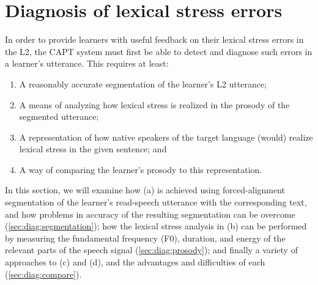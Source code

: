 %
%
\chapter{Diagnosis of lexical stress errors}
\label{chap:diagnosis}


In order to provide learners with useful feedback on their lexical stress errors in the L2, the CAPT system must first be able to detect and diagnose such errors in a learner's utterance. This requires at least:
\begin{enumerate}[label=(\alph*)]
\item A reasonably accurate segmentation of the learner's L2 utterance; %
\item A means of analyzing how lexical stress is realized in the prosody of the segmented utterance;
\item A representation of how native speakers of the target language (would) realize  lexical stress in the given sentence; and
\item A way of comparing the learner's prosody to this representation. 
\end{enumerate}

In this section, we will examine how (a) is achieved using forced-alignment segmentation of the learner's read-speech utterance with the corresponding text, and how problems in accuracy of the resulting segmentation can be overcome (\cref{sec:diag:segmentation}); how the lexical stress analysis in (b) can be performed by measuring the fundamental frequency (F0), duration, and energy of the relevant parts of the speech signal (\cref{sec:diag:prosody}); and finally a variety of approaches to (c) and (d), and the advantages and difficulties of each (\cref{sec:diag:compare}).

%
%	

